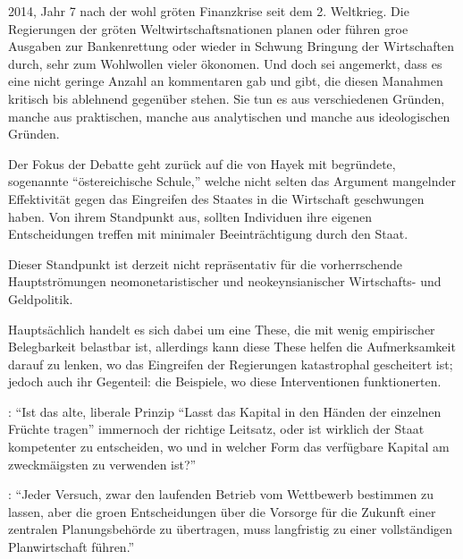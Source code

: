 \documentclass[
    onecolumn,
    a4paper,
    abstracton,
    parskip=half
    ,final
    ]{scrartcl}
\begin{document}
2014, Jahr 7 nach der wohl gr{\"o}{\s}ten Finanzkrise seit dem 2. Weltkrieg. Die Regierungen der gr{\"o}{\s}ten Weltwirtschaftsnationen planen oder f{\"u}hren gro{\s}e Ausgaben zur Bankenrettung oder wieder in Schwung Bringung der Wirtschaften durch, sehr zum Wohlwollen vieler {\"o}konomen. Und doch sei angemerkt, dass es eine nicht geringe Anzahl an kommentaren gab und gibt, die diesen Ma{\s}nahmen kritisch bis ablehnend gegen{\"u}ber stehen. Sie tun es aus verschiedenen Gr{\"u}nden, manche aus praktischen, manche aus analytischen und manche aus ideologischen Gr{\"u}nden.

Der Fokus der Debatte geht zur{\"u}ck auf die von Hayek mit begr{\"u}ndete, sogenannte "`{\"o}stereichische Schule,"' welche nicht selten das Argument mangelnder Effektivit{\"a}t gegen das Eingreifen des Staates in die Wirtschaft geschwungen haben. Von ihrem Standpunkt aus, sollten Individuen ihre eigenen Entscheidungen treffen mit minimaler Beeintr{\"a}chtigung durch den Staat.

Dieser Standpunkt ist derzeit nicht repr{\"a}sentativ f{\"u}r die vorherrschende Hauptstr{\"o}mungen neomonetaristischer und neokeynsianischer Wirtschafts- und Geldpolitik.

Haupts{\"a}chlich handelt es sich dabei um eine These, die mit wenig empirischer Belegbarkeit belastbar ist, allerdings kann diese These helfen die Aufmerksamkeit darauf zu lenken, wo das Eingreifen der Regierungen katastrophal gescheitert ist; jedoch auch ihr Gegenteil: die Beispiele, wo diese Interventionen funktionerten.

\citep[vgl.][S.23f]{Hayek1969}: "`Ist das alte, liberale Prinzip “Lasst das Kapital in den H{\"a}nden der einzelnen Fr{\"u}chte tragen” immernoch der richtige Leitsatz,
 oder ist wirklich der Staat kompetenter zu entscheiden, wo und in welcher Form das verf{\"u}gbare Kapital am zweckm{\"a}{\s}igsten zu verwenden ist?"'

 


















 \citep[vgl.][S.23f]{Hayek1969}: "`Jeder Versuch, zwar den laufenden Betrieb vom Wettbewerb bestimmen zu lassen,
 aber die gro{\s}en Entscheidungen {\"u}ber die Vorsorge f{\"u}r die Zukunft einer zentralen Planungsbeh{\"o}rde zu {\"u}bertragen,
muss langfristig zu einer vollst{\"a}ndigen Planwirtschaft f{\"u}hren."'
\end{document}
